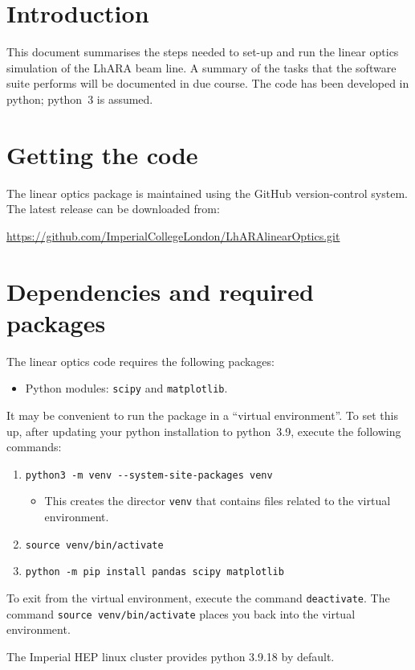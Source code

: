 \section*{Introduction}
This document summarises the steps needed to set-up and run
the linear optics simulation of the LhARA beam line.
A summary of the tasks that the software suite performs
will be documented in due course.
The code has been developed in python; python~3 is assumed.

\section*{Getting the code}
The linear optics package is maintained using the GitHub
version-control system.
The latest release can be downloaded from: \\
\centerline{
  \href{https://github.com/ImperialCollegeLondon/LhARAlinearOptics.git}{https://github.com/ImperialCollegeLondon/LhARAlinearOptics.git}
}

\section*{Dependencies and required packages}
The linear optics code requires the following packages:
\begin{itemize}
  \item Python modules: \verb+scipy+ and \verb+matplotlib+. 
\end{itemize}
It may be convenient to run the package in a ``virtual environment''.
To set this up, after updating your python installation to python~3.9,
execute the following commands:
\begin{enumerate}
  \item \verb+python3 -m venv --system-site-packages venv+
    \begin{itemize}
      \item This creates the director \verb+venv+ that contains files
        related to the virtual environment.
    \end{itemize}
  \item \verb+source venv/bin/activate+
  \item \verb+python -m pip install pandas scipy matplotlib+
\end{enumerate}
To exit from the virtual environment, execute the command
\verb+deactivate+. 
The command \verb+source venv/bin/activate+ places you back
into the virtual environment.

The Imperial HEP linux cluster provides python 3.9.18 by default.

